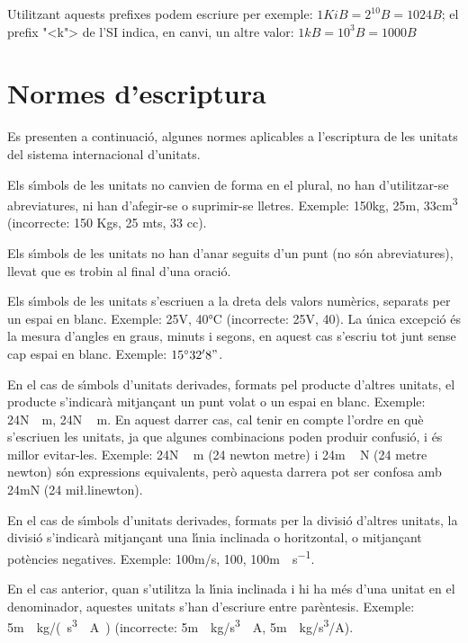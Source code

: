 Utilitzant aquests prefixes podem escriure per exemple: $1\unit{KiB} =2^{10}\unit{B} = 1024\unit{B}$; el prefix {"<}k{">} de l'SI indica, en canvi, un altre valor:  $1\unit{kB} =10^3\unit{B} = 1000\unit{B}$

\section{Normes d'escriptura}

Es presenten a continuaci\'{o}, algunes normes aplicables a l'escriptura
de les unitats del sistema internacional d'unitats.

Els s\'{\i}mbols de les unitats no canvien de forma en el plural, no han
d'utilitzar-se abreviatures, ni han d'afegir-se o suprimir-se
lletres. Exemple: 150\unit{kg}, 25\unit{m},  33\unit{cm^3}
(incorrecte: 150 Kgs, 25 mts, 33 cc).

Els s\'{\i}mbols de les unitats no han d'anar seguits d'un punt (no s\'{o}n
abreviatures), llevat que es trobin al final d'una oraci\'{o}.

Els s\'{\i}mbols de les unitats s'escriuen a la dreta dels valors
num\`{e}rics, separats per un espai en blanc. Exemple: 25\unit{V},
40\unit{\celsius} (incorrecte: 25V, 40\celsius). La \'{u}nica excepci\'{o} \'{e}s la mesura d'angles en graus, minuts i segons, en aquest cas s'escriu tot junt sense cap espai en blanc. Exemple: $15^\circ{}32'8"$.

En el cas de s\'{\i}mbols d'unitats derivades, formats pel producte
d'altres unitats, el producte s'indicar\`{a} mitjan\c{c}ant un punt volat o
un espai en blanc. Exemple: 24\unit{N\cdot m}, 24\unit{N\,m}. En
aquest darrer cas, cal tenir en compte  l'ordre en qu\`{e} s'escriuen
les unitats, ja que algunes combinacions poden produir confusi\'{o}, i
\'{e}s millor evitar-les. Exemple: 24\unit{N\,m} (24 newton metre) i
24\unit{m\,N} (24 metre newton) s\'{o}n expressions equivalents, per\`{o}
aquesta darrera pot ser confosa amb 24\unit{mN} (24 mi{\l.l}inewton).

En el cas de s\'{\i}mbols d'unitats derivades, formats per la divisi\'{o}
d'altres unitats, la divisi\'{o} s'indicar\`{a} mitjan\c{c}ant una l\'{\i}nia
inclinada o horitzontal, o mitjan\c{c}ant pot\`{e}ncies negatives. Exemple:
100\unit{m/s}, 100\unit{}, 100\unit{m\cdot s^{-1}}.

En el cas anterior, quan s'utilitza la l\'{\i}nia inclinada i hi ha m\'{e}s
d'una unitat en el denominador, aquestes unitats s'han d'escriure
entre par\`{e}ntesis. Exemple: 5\unit{m\cdot kg/(s^3\cdot A)}
(incorrecte: 5\unit{m\cdot kg/s^3\cdot A}, 5\unit{m\cdot kg/s^3/
A}).

